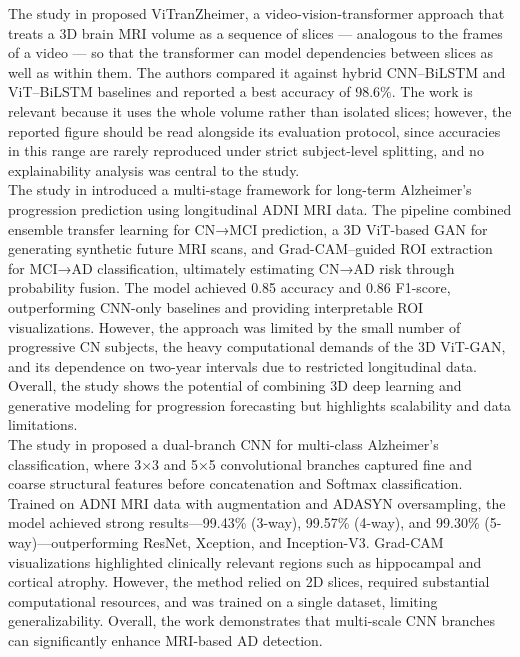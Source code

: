 The study in \cite{akan2025leveraging} proposed ViTranZheimer, a video-vision-transformer approach that treats a 3D brain MRI volume as a sequence of slices --- analogous to the frames of a video --- so that the transformer can model dependencies between slices as well as within them. The authors compared it against hybrid CNN--BiLSTM and ViT--BiLSTM baselines and reported a best accuracy of 98.6\%. The work is relevant because it uses the whole volume rather than isolated slices; however, the reported figure should be read alongside its evaluation protocol, since accuracies in this range are rarely reproduced under strict subject-level splitting, and no explainability analysis was central to the study.\\

The study in \cite{aghaei2025integrated} introduced a multi-stage framework for long-term Alzheimer’s progression prediction using longitudinal ADNI MRI data. The pipeline combined ensemble transfer learning for CN→MCI prediction, a 3D ViT-based GAN for generating synthetic future MRI scans, and Grad-CAM–guided ROI extraction for MCI→AD classification, ultimately estimating CN→AD risk through probability fusion. The model achieved 0.85 accuracy and 0.86 F1-score, outperforming CNN-only baselines and providing interpretable ROI visualizations. However, the approach was limited by the small number of progressive CN subjects, the heavy computational demands of the 3D ViT-GAN, and its dependence on two-year intervals due to restricted longitudinal data. Overall, the study shows the potential of combining 3D deep learning and generative modeling for progression forecasting but highlights scalability and data limitations.\\

The study in \cite{el2024novel} proposed a dual-branch CNN for multi-class Alzheimer’s classification, where 3×3 and 5×5 convolutional branches captured fine and coarse structural features before concatenation and Softmax classification. Trained on ADNI MRI data with augmentation and ADASYN oversampling, the model achieved strong results—99.43\% (3-way), 99.57\% (4-way), and 99.30\% (5-way)—outperforming ResNet, Xception, and Inception-V3. Grad-CAM visualizations highlighted clinically relevant regions such as hippocampal and cortical atrophy. However, the method relied on 2D slices, required substantial computational resources, and was trained on a single dataset, limiting generalizability. Overall, the work demonstrates that multi-scale CNN branches can significantly enhance MRI-based AD detection.\\

